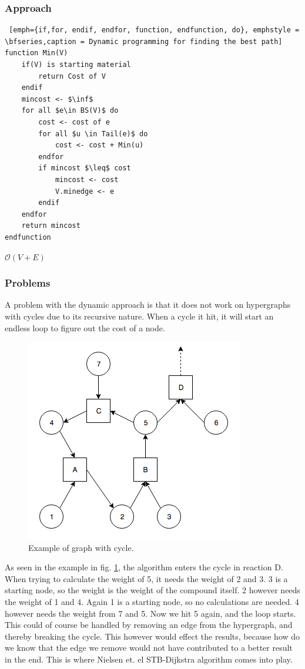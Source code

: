 \documentclass[a4paper,10pt,titlepage]{paper}
\begin{document}
\subsubsection{Approach}
\begin{lstlisting} [emph={if,for, endif, endfor, function, endfunction, do}, emphstyle = \bfseries,caption = Dynamic programming for finding the best path]
function Min(V)
	if(V) is starting material 
		return Cost of V
	endif
	mincost <- $\inf$
	for all $e\in BS(V)$ do
		cost <- cost of e
		for all $u \in Tail(e)$ do
			cost <- cost + Min(u)
		endfor
		if mincost $\leq$ cost 
			mincost <- cost
			V.minedge <- e
		endif
	endfor
	return mincost
endfunction
\end{lstlisting}

$\mathcal{O}(V+E)$


\subsubsection{Problems}
A problem with the dynamic approach is that it does not work on hypergraphs with cycles due to its recursive nature. When a cycle it hit, it will start an endless loop to figure out the cost of a node. 
\begin{figure}[H]
\centering
\includegraphics[scale=0.5]{Billeder/CycleGraph.png}
\caption{Example of graph with cycle.}
\label{fig::CycleGraph}
\end{figure}
As seen in the example in fig. \ref{fig::CycleGraph}, the algorithm enters the cycle in reaction D. When trying to calculate the weight of 5, it needs the weight of 2 and 3. 3 is a starting node, so the weight is the weight of the compound itself. 2 however needs the weight of 1 and 4. Again 1 is a starting node, so no calculations are needed. 4 however needs the weight from 7 and 5. Now we hit 5 again, and the loop starts. This could of course be handled by removing an edge from  the hypergraph, and thereby breaking the cycle. This however would effect the results, because how do we know that the edge we remove would not have contributed to a better result in the end. This is where Nielsen et. el STB-Dijkstra algorithm comes into play.
\end{document}
